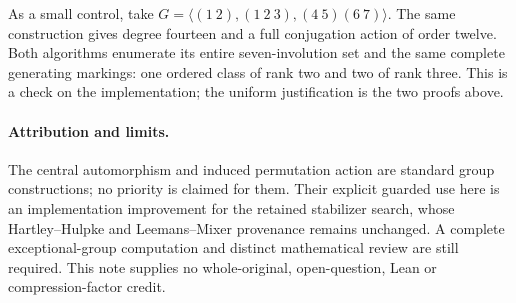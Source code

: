 \documentclass[11pt,a4paper]{article}
\begin{document}
As a small control, take
$G=\langle(1\ 2),(1\ 2\ 3),(4\ 5)(6\ 7)\rangle$.
The same construction gives degree fourteen and a full conjugation action
of order twelve. Both algorithms enumerate its entire seven-involution
set and the same complete generating markings: one ordered class of rank
two and two of rank three. This is a check on the implementation; the
uniform justification is the two proofs above.

\paragraph{Attribution and limits.}
The central automorphism and induced permutation action are standard group
constructions; no priority is claimed for them. Their explicit guarded use
here is an implementation improvement for the retained stabilizer search,
whose Hartley--Hulpke and Leemans--Mixer provenance remains unchanged.
A complete exceptional-group computation and distinct mathematical review
are still required. This note supplies no whole-original, open-question,
Lean or compression-factor credit.
\end{document}
